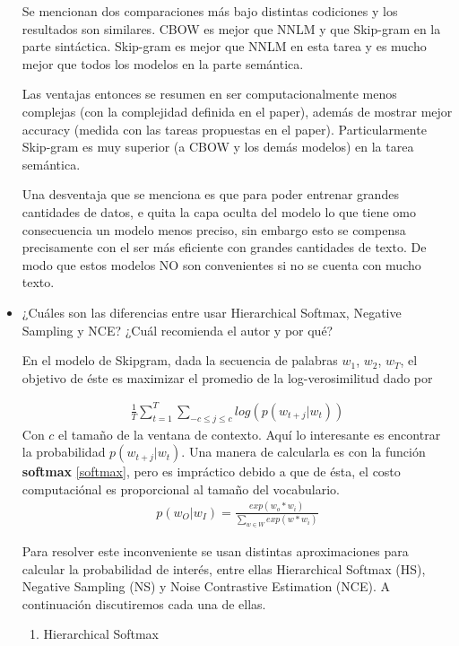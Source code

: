 \documentclass[letter, 11pt, twoside]{report}
\begin{document}
\begin{itemize}
   Se mencionan dos comparaciones más bajo distintas codiciones y los resultados son similares. CBOW es mejor que NNLM  y que Skip-gram en la parte sintáctica. Skip-gram es  mejor que NNLM en esta tarea y es mucho mejor que todos los modelos en la parte semántica.

   Las ventajas entonces se resumen en ser computacionalmente menos complejas (con la complejidad definida en el paper), además de mostrar mejor accuracy (medida con las tareas propuestas en el paper). Particularmente Skip-gram es muy superior (a CBOW y los demás modelos) en la tarea semántica.

   Una desventaja que se menciona es que para poder entrenar grandes cantidades de datos, e quita la capa oculta del modelo lo que tiene omo consecuencia un modelo menos preciso, sin embargo esto se compensa precisamente con el ser más eficiente con grandes cantidades de texto. De modo que estos modelos NO son convenientes si no se cuenta con mucho texto.

    \item ¿Cuáles son las diferencias entre usar Hierarchical Softmax, Negative Sampling y NCE? ¿Cuál recomienda el autor y por qué?
    
    En el modelo de Skipgram, dada la secuencia de palabras $w_1$, $w_2$, $w_T$, el objetivo de éste es maximizar el promedio de la log-verosimilitud dado por

    \begin{eqnarray}
      \frac{1}{T}\sum_{t=1}^{T}\sum_{-c\leq j \leq c}log (p(w_{t+j}|w_t))
    \end{eqnarray}
     Con $c$ el tamaño de la ventana de contexto. Aquí lo interesante es encontrar la probabilidad $p(w_{t+j}|w_t)$. Una manera de calcularla es con la función \textbf{softmax} \ref{softmax}, pero es impráctico debido a que de ésta, el costo computaciónal es proporcional al tamaño del vocabulario.
     \begin{eqnarray}
      p(w_{O}|w_I)=\frac{exp(w_o * w_i )}{\sum_{w\in W}exp(w * w_i )}
      \label{softmax}
    \end{eqnarray}

     Para resolver este inconveniente se usan distintas aproximaciones para calcular la probabilidad de interés, entre ellas Hierarchical Softmax (HS), Negative Sampling (NS) y Noise Contrastive Estimation (NCE). A continuación discutiremos cada una de ellas.



    \begin{enumerate}
      \item Hierarchical Softmax
      

\end{enumerate}
\end{itemize}
\end{document}
